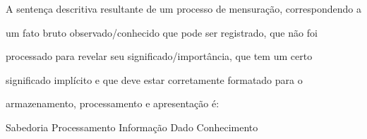 \documentclass[12pt, addpoints]{exam}
\begin{document}
\begin{questions}
\question

A sentença descritiva resultante de um processo de mensuração, correspondendo a

um fato bruto observado/conhecido que pode ser registrado, que não foi

processado para revelar seu significado/importância, que tem um certo

significado implícito e que deve estar corretamente formatado para o

armazenamento, processamento e apresentação é:
\begin{choices}
\choice Sabedoria
\choice Processamento
\choice Informação
\choice Dado
\choice Conhecimento
\end{choices}



    \end{questions}
    
\end{document}

